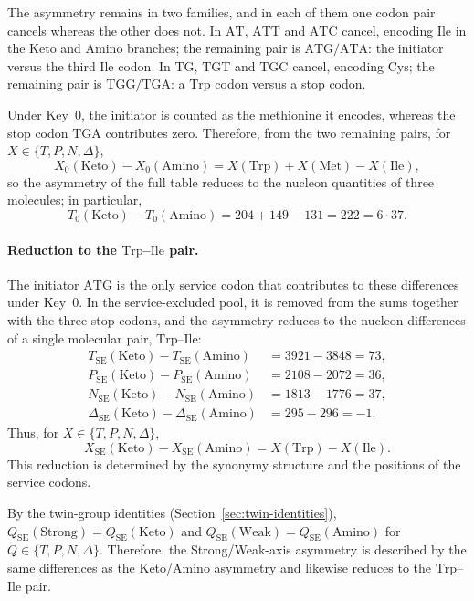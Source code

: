 \documentclass[11pt,a4paper]{article}
\renewcommand{\_}{\origunderscore\allowbreak}
\begin{document}
The asymmetry remains in two families, and in each of them one codon
pair cancels whereas the other does not. In $\mathrm{AT}$,
$\mathrm{ATT}$ and $\mathrm{ATC}$ cancel, encoding $\mathrm{Ile}$ in
the Keto and Amino branches; the remaining pair is
$\mathrm{ATG}/\mathrm{ATA}$: the initiator versus the third
$\mathrm{Ile}$ codon. In $\mathrm{TG}$, $\mathrm{TGT}$ and
$\mathrm{TGC}$ cancel, encoding $\mathrm{Cys}$; the remaining pair is
$\mathrm{TGG}/\mathrm{TGA}$: a $\mathrm{Trp}$ codon versus a stop
codon.

Under Key~0, the initiator is counted as the methionine it encodes,
whereas the stop codon $\mathrm{TGA}$ contributes zero. Therefore,
from the two remaining pairs, for $X\in\{T,P,N,\Delta\}$,
\[
X_{0}(\mathrm{Keto})-X_{0}(\mathrm{Amino})
=
X(\mathrm{Trp})+X(\mathrm{Met})-X(\mathrm{Ile}),
\]
so the asymmetry of the full table reduces to the nucleon quantities
of three molecules; in particular,
\[
T_{0}(\mathrm{Keto}) - T_{0}(\mathrm{Amino})
  = 204 + 149 - 131 = 222 = 6 \cdot 37.
\]

\paragraph{Reduction to the $\mathrm{Trp}$--$\mathrm{Ile}$ pair.}
The initiator $\mathrm{ATG}$ is the only service codon that contributes
to these differences under Key~0. In the service-excluded pool,
it is removed from the sums together with the three stop codons, and
the asymmetry reduces to the nucleon differences of a single molecular
pair, $\mathrm{Trp}$--$\mathrm{Ile}$:
\[
\begin{aligned}
T_{\mathrm{SE}}(\mathrm{Keto}) - T_{\mathrm{SE}}(\mathrm{Amino})
  &= 3921 - 3848 = 73, \\
P_{\mathrm{SE}}(\mathrm{Keto}) - P_{\mathrm{SE}}(\mathrm{Amino})
  &= 2108 - 2072 = 36, \\
N_{\mathrm{SE}}(\mathrm{Keto}) - N_{\mathrm{SE}}(\mathrm{Amino})
  &= 1813 - 1776 = 37, \\
\Delta_{\mathrm{SE}}(\mathrm{Keto})
  - \Delta_{\mathrm{SE}}(\mathrm{Amino})
  &= 295 - 296 = -1.
\end{aligned}
\]
Thus, for $X\in\{T,P,N,\Delta\}$,
\[
X_{\mathrm{SE}}(\mathrm{Keto})
-
X_{\mathrm{SE}}(\mathrm{Amino})
=
X(\mathrm{Trp})-X(\mathrm{Ile}).
\]
This reduction is determined by the synonymy structure and the
positions of the service codons.

By the twin-group identities (Section~\ref{sec:twin-identities}),
$Q_{\mathrm{SE}}(\mathrm{Strong}) = Q_{\mathrm{SE}}(\mathrm{Keto})$
and
$Q_{\mathrm{SE}}(\mathrm{Weak}) = Q_{\mathrm{SE}}(\mathrm{Amino})$
for $Q\in\{T,P,N,\Delta\}$. Therefore, the Strong/Weak-axis asymmetry
is described by the same differences as the Keto/Amino asymmetry and
likewise reduces to the $\mathrm{Trp}$--$\mathrm{Ile}$ pair.
\end{document}
